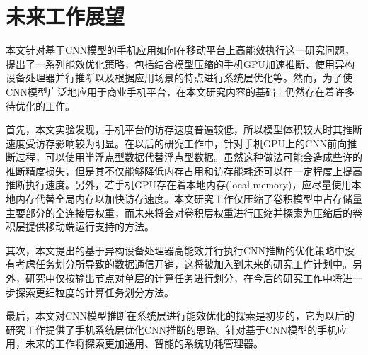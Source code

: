 \section{未来工作展望}
本文针对基于CNN模型的手机应用如何在移动平台上高能效执行这一研究问题，提出了一系列能效优化策略，包括结合模型压缩的手机GPU加速推断、使用异构设备处理器并行推断以及根据应用场景的特点进行系统层优化等。然而，为了使CNN模型广泛地应用于商业手机平台，在本文研究内容的基础上仍然存在着许多待优化的工作。

首先，本文实验发现，手机平台的访存速度普遍较低，所以模型体积较大时其推断速度受访存影响较为明显。在以后的研究工作中，针对手机GPU上的CNN前向推断过程，可以使用半浮点型数据代替浮点型数据。虽然这种做法可能会造成些许的推断精度损失，但是其不仅能够降低内存占用和访存能耗还可以在一定程度上提高推断执行速度。另外，若手机GPU存在着本地内存(local memory)，应尽量使用本地内存代替全局内存以加快访存速度。本文研究工作仅压缩了卷积模型中占存储量主要部分的全连接层权重，而未来将会对卷积层权重进行压缩并探索为压缩后的卷积层提供移动端运行支持的方法。

其次，本文提出的基于异构设备处理器高能效并行执行CNN推断的优化策略中没有考虑任务划分所导致的数据通信开销，这将被加入到未来的研究工作计划中。另外，研究中仅按输出节点对单层的计算任务进行划分，在今后的研究工作中将进一步探索更细粒度的计算任务划分方法。

最后，本文对CNN模型推断在系统层进行能效优化的探索是初步的，它为以后的研究工作提供了手机系统层优化CNN推断的思路。针对基于CNN模型的手机应用，未来的工作将探索更加通用、智能的系统功耗管理器。
\cleardoublepage 